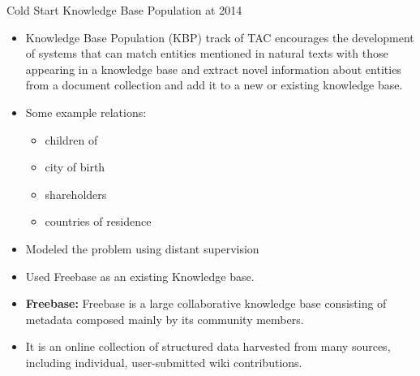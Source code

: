 \documentclass{beamer}
\begin{document}
\begin{frame}{Cold Start Knowledge Base Population at 2014}

\begin{itemize}
 
 \item Knowledge Base Population (KBP) track of TAC encourages the development of systems that can match entities mentioned in natural texts with those
appearing in a knowledge base and extract novel information about entities from a document collection and add it to a new or existing knowledge base. \pause
 
 \item Some example relations:
    \begin{itemize}
      \item children of
      \item city of birth
      \item shareholders
      \item countries of residence
    \end{itemize}
\end{itemize}

\end{frame}

\begin{frame}

\begin{itemize}
  \item  Modeled the problem using distant supervision
  \item Used Freebase as an existing Knowledge base.
    
    \item \textbf{Freebase: }Freebase is a large collaborative knowledge base consisting of metadata composed mainly by its community members. 
    \item It is an online collection of structured data harvested from many sources, including individual, user-submitted wiki contributions.
 \end{itemize}

 
\end{frame}
\end{document}
